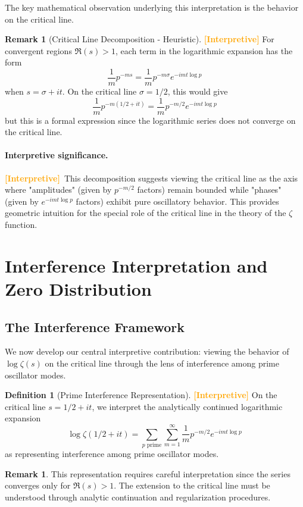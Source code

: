 \documentclass[12pt]{article}
\theoremstyle{plain}
\theoremstyle{definition}
\newtheorem{definition}[theorem]{Definition}
\newtheorem{remark}[theorem]{Remark}
\newcommand{\statusinterp}{\textcolor{orange}{\textbf{[Interpretive]}}}
\begin{document}
The key mathematical observation underlying this interpretation is the behavior on the critical line.

\begin{remark}[Critical Line Decomposition - Heuristic] \statusinterp
For convergent regions $\Re(s) > 1$, each term in the logarithmic expansion has the form
$$
\frac{1}{m} p^{-ms} = \frac{1}{m} p^{-m\sigma} e^{-imt\log p}
$$
when $s = \sigma + it$. On the critical line $\sigma = 1/2$, this would give
$$
\frac{1}{m} p^{-m(1/2 + it)} = \frac{1}{m} p^{-m/2} e^{-imt\log p}
$$
but this is a formal expression since the logarithmic series does not converge on the critical line.
\end{remark}

\paragraph{Interpretive significance.} \statusinterp\ This decomposition suggests viewing the critical line as the axis where "amplitudes" (given by $p^{-m/2}$ factors) remain bounded while "phases" (given by $e^{-imt\log p}$ factors) exhibit pure oscillatory behavior. This provides geometric intuition for the special role of the critical line in the theory of the $\zeta$ function.

\section{Interference Interpretation and Zero Distribution}

\subsection{The Interference Framework}

We now develop our central interpretive contribution: viewing the behavior of $\log\zeta(s)$ on the critical line through the lens of interference among prime oscillator modes.

\begin{definition}[Prime Interference Representation] \statusinterp
On the critical line $s = 1/2 + it$, we interpret the analytically continued logarithmic expansion
$$
\log\zeta(1/2 + it) = \sum_{p \text{ prime}}\sum_{m=1}^{\infty} \frac{1}{m} p^{-m/2} e^{-imt\log p}
$$
as representing interference among prime oscillator modes.
\end{definition}

\begin{remark}
This representation requires careful interpretation since the series converges only for $\Re(s) > 1$. The extension to the critical line must be understood through analytic continuation and regularization procedures.
\end{remark}
\end{document}
